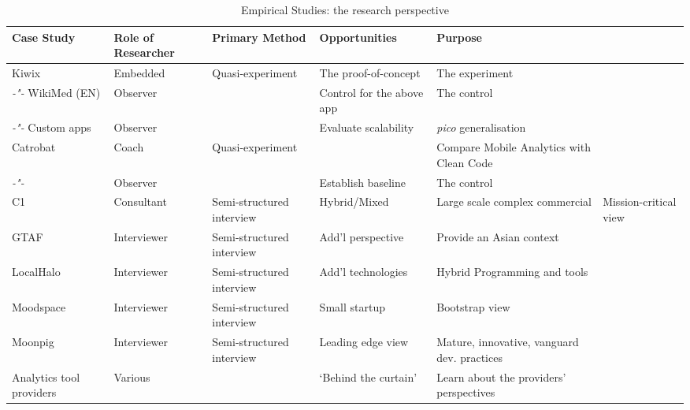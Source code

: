 \begin{table}
    \centering
    \tabcolsep=0.06cm
    \tiny
    \begin{tabular}{lllll}\toprule
    Case Study                 & Role of Researcher &  Primary Method   & Opportunities             & Purpose \\
    \midrule
    Kiwix                      & Embedded           & Quasi-experiment   &The proof-of-concept      & The experiment \\ 
     \textit{-"-} WikiMed (EN) & Observer           &                    &Control for the above app & The control  \\
    \textit{-"-} Custom apps   & Observer           &                    & Evaluate scalability     & \textit{pico} generalisation \\
    \midrule
    Catrobat                   & Coach              & Quasi-experiment   &                          & Compare Mobile Analytics with Clean Code \\
     \textit{-"-}              & Observer           &                    & Establish baseline       & The control  \\
     \midrule
    C1                         & Consultant         & Semi-structured interview & Hybrid/Mixed & Large scale complex commercial & Mission-critical view \\
    GTAF                       & Interviewer        & Semi-structured interview & Add'l perspective & Provide an Asian context \\
    LocalHalo                  & Interviewer        & Semi-structured interview & Add'l technologies & Hybrid Programming and tools \\
    Moodspace                  & Interviewer        & Semi-structured interview & Small startup &Bootstrap view \\
    Moonpig                    & Interviewer        & Semi-structured interview & Leading edge view & Mature, innovative, vanguard dev. practices \\
    Analytics tool providers   & Various            & & `Behind the curtain' & Learn about the providers' perspectives \\
    \bottomrule
    \end{tabular}
    \caption{Empirical Studies: the research perspective}
    \label{tab:empirical-studies-research-perspective}
\end{table}


